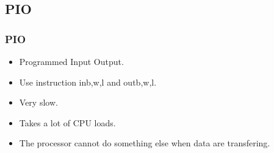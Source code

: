 \subsection{PIO}

\begin{frame}
        \frametitle{PIO}
        \begin{itemize}
        \item Programmed Input Output.
        \item Use instruction in{b,w,l} and out{b,w,l}.
        \item Very slow.
        \item Takes a lot of CPU loads.
        \item The processor cannot do something else when data are
        transfering.
        \end{itemize}
\end{frame}

